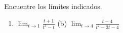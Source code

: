 \item Encuentre los límites indicados.
\begin{enumerate}
    \item[(a)] $\displaystyle \lim_{t \to 1} \frac{t+1}{t^3-t}$ \quad (b) $\displaystyle \lim_{t \to 4} \frac{t-4}{t^2-3t-4}$
\end{enumerate}
